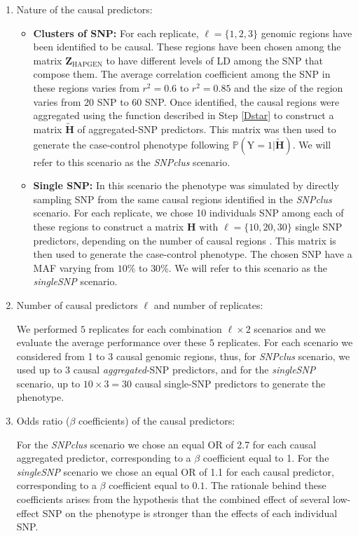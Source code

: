 \documentclass[]{book}
\begin{document}
\begin{enumerate}
\def\labelenumi{\arabic{enumi}.}
\item
  Nature of the causal predictors:

  \begin{itemize}
  \item
    \textbf{Clusters of SNP:} For each replicate,
    \(\ell = \lbrace 1, 2, 3 \rbrace\) genomic regions have been
    identified to be causal. These regions have been chosen among
    the matrix \(\mathbf{Z}_{\text{HAPGEN}}\) to have different levels of LD
    among the SNP that compose them. The average correlation
    coefficient among the SNP in these regions varies from \(r^2=0.6\)
    to \(r^2=0.85\) and the size of the region varies from 20 SNP to
    60 SNP. Once identified, the causal regions were aggregated
    using the function described in Step \ref{Dstar} to construct
    a matrix \(\tilde{\mathbf{H}}\) of aggregated-SNP predictors. This matrix
    was then used to generate the case-control phenotype following
    \(\mathbb{P}(\mathrm{Y}=1|\tilde{\mathbf{H}})\). We will refer to this scenario
    as the \emph{SNPclus} scenario.
  \item
    \textbf{Single SNP:} In this scenario the phenotype was simulated by
    directly sampling SNP from the same causal regions identified in
    the \emph{SNPclus} scenario. For each replicate, we chose 10
    individuals SNP among each of these regions to construct a
    matrix \(\mathbf{H}\) with \(\ell = \lbrace 10 ,20 ,30 \rbrace\) single SNP
    predictors, depending on the number of causal regions . This
    matrix is then used to generate the case-control phenotype. The
    chosen SNP have a MAF varying from \(10 \%\) to \(30\%\). We will
    refer to this scenario as the \emph{singleSNP} scenario.
  \end{itemize}
\item
  Number of causal predictors \(\ell\) and number of replicates:

  We performed \(5\) replicates for each combination \(\ell \times 2\)
  scenarios and we evaluate the average performance over these \(5\)
  replicates. For each scenario we considered from 1 to 3 causal
  genomic regions, thus, for \emph{SNPclus} scenario, we used up to 3
  causal \emph{aggregated}-SNP predictors, and for the \emph{singleSNP}
  scenario, up to \(10 \times 3 = 30\) causal single-SNP predictors to
  generate the phenotype.
\item
  Odds ratio (\(\beta\) coefficients) of the causal predictors:

  For the \emph{SNPclus} scenario we chose an equal OR of 2.7 for each
  causal aggregated predictor, corresponding to a \(\beta\) coefficient
  equal to 1. For the \emph{singleSNP} scenario we chose an equal OR of 1.1
  for each causal predictor, corresponding to a \(\beta\) coefficient
  equal to \(0.1\). The rationale behind these coefficients arises from
  the hypothesis that the combined effect of several low-effect SNP on
  the phenotype is stronger than the effects of each individual SNP.
\end{enumerate}
\end{document}
